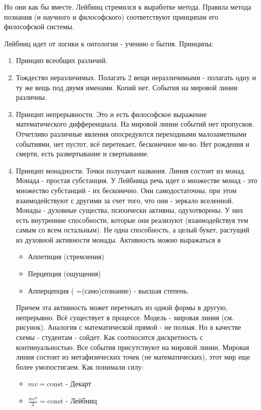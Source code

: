 Но они как бы вместе. Лейбниц стремился к выработке метода. Правила метода познания (и научного и философского) соответствуют принципам его философской системы.

Лейбниц идет от логики к онтологии - учению о бытия. Принципы:
\begin{enumerate}
	\item Принцип всеобщих различий. 
	\item Тождество неразличимых. Полагать 2 вещи неразличимыми - полагать одну и ту же вещь под двумя именами. Копий нет. События на мировой линии различны. 
	\item Принцип непрерывности. Это и есть философское выражение математического дифференциала. На мировой линии событий нет пропусков. Отчетливо различные явления опосредуются переходными малозаметными событиями, нет пустот, всё перетекает, бесконечное мн-во. Нет рождения и смерти, есть развертывание и свертывание. 
	\item Принцип монадности. Точки получают названия. Линия состоит из монад. Монада - простая субстанция. У Лейбница речь идет о множестве монад - это множество субстанций - их бесконечно. Они самодостаточны, при этом взаимодействуют с другими за счет того, что они - зеркало вселенной. Монады - духовные существа, психически активны, одухотворены. У них есть внутренние способности, которые они реализуют (взаимодействуя тем самым со всем остальным). Не одна способность, а целый букет, растущий из духовной активности монады. Активность можно выражаться в 
	\begin{itemize}
		\item Аппетиция (стремления)
		\item Перцепция (ощущения)
		\item Апперцепция ( =(само)сознание) - высшая степень.
	\end{itemize}
	Причем эта активность может перетекать из одной формы в другую, непрерывно. 
	Всё существует в процессе. 
	Модель - мировая линия (см. рисунок). Аналогия с математической прямой - не полная. Но в качестве схемы - студентам - сойдет. Как соотносится дискретность с континуальностью. Все события присутствуют на мировой линии. Мировая линия состоит из метафизических точек (не математических), этот мир еще более умопостигаем.
	Как понимали силу:
	\begin{itemize}
		\item $mv=\text{const}$ - Декарт
		\item $\frac{mv^2}2=\text{const}$ - Лейбниц
	\end{itemize}

\end{enumerate}
